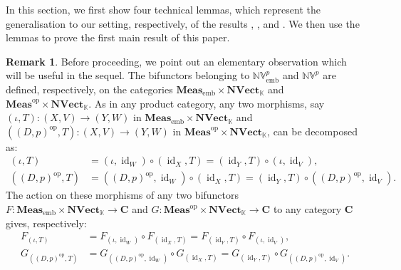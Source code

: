 \documentclass{amsart}
\theoremstyle{definition}
\newtheorem{remark}[definition]{Remark}
\theoremstyle{plain}
\newcommand{\id}{\operatorname{id}}
\newcommand{\opMeas}{\mathbf{Meas}^\mathrm{op}}
\newcommand{\embMeas}{\mathbf{Meas}_\mathrm{emb}}
\newcommand{\NVect}{\mathbf{NVect}_{\mathbb{K}}}
\newcommand{\NVembp}{\mathbb{NV}_{\mathrm{emb}}^p}
\newcommand{\NVp}{\mathbb{NV}^p}
\begin{document}
        In this section, we first show four technical lemmas, which represent the generalisation to our setting, respectively, of the results \cite[Lemma 3.1]{Leinster2023}, \cite[Lemma 3.2]{Leinster2023}, \cite[Lemma 3.3]{Leinster2023} and \cite[Lemma 3.5]{Leinster2023}.
        We then use the lemmas to prove the first main result of this paper.

        \begin{remark}
        \label{rem:morphisms and functors in product categories in the normed case}
            Before proceeding, we point out an elementary observation which will be useful in the sequel.
            The bifunctors belonging to $\NVembp$ and $\NVp$ are defined, respectively, on the categories $\embMeas \times \NVect$ and $\opMeas \times \NVect$. 
            As in any product category, any two morphisms, say $(\iota,T) \colon (X,V) \rightarrow (Y,W)$ in $\embMeas \times \NVect$ and $\left( (D,p)^{\mathrm{op}},T \right) \colon (X,V) \rightarrow (Y,W)$ in $\opMeas \times \NVect$, can be decomposed as:
            \begin{equation} 
            \label{eq:decomposition of morphisms in product categories in the normed case}
                \begin{split}
                    (\iota,T) &= (\iota,\id_W) \circ (\id_X,T) = (\id_Y,T) \circ (\iota,\id_V), \\
                    \left( (D,p)^{\mathrm{op}},T \right) &= \left( (D,p)^{\mathrm{op}},\id_W \right) \circ (\id_X,T) = (\id_Y,T) \circ \left( (D,p)^{\mathrm{op}},\id_V \right).
                \end{split}
            \end{equation}
            The action on these morphisms of any two bifunctors $F \colon \embMeas \times \NVect \rightarrow \mathbf{C}$ and $G \colon \opMeas \times \NVect \rightarrow \mathbf{C}$ to any category $\mathbf{C}$ gives, respectively:
            \begin{equation*}
                \begin{split}
                    F_{(\iota,T)} &= F_{(\iota,\id_W)} \circ F_{(\id_X,T)} = F_{(\id_Y,T)} \circ F_{(\iota,\id_V)}, \\
                    G_{\left( (D,p)^{\mathrm{op}},T \right)} &= G_{\left( (D,p)^{\mathrm{op}},\id_W \right)} \circ G_{(\id_X,T)} = G_{(\id_Y,T)} \circ G_{\left( (D,p)^{\mathrm{op}},\id_V \right)}.
                \end{split}
            \end{equation*}
        \end{remark}
\end{document}
